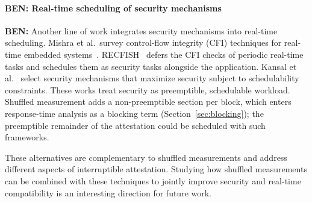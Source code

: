 \documentclass{ieeeaccess}
\DeclareRobustCommand{\ben}[1]{{\color{BENcolor}\textbf{BEN:} #1}}
\begin{document}
\paragraph{\ben{Real-time scheduling of security mechanisms}}
\ben{Another line of work integrates security mechanisms into real-time scheduling.
Mishra et al.\ survey control-flow integrity (CFI) techniques for real-time embedded systems~\cite{mishra2022survey}.
RECFISH~\cite{mishra2023procrastinating} defers the CFI checks of periodic real-time tasks and schedules them as security tasks alongside the application.
Kansal et al.~\cite{kansal2023integrated} select security mechanisms that maximize security subject to schedulability constraints.
These works treat security as preemptible, schedulable workload.
Shuffled measurement adds a non-preemptible section per block, which enters response-time analysis as a blocking term (Section~\ref{sec:blocking}); the preemptible remainder of the attestation could be scheduled with such frameworks.}


These alternatives are complementary to shuffled measurements and address different aspects of interruptible attestation.
Studying how shuffled measurements can be combined with these techniques to jointly improve security and real-time compatibility is an interesting direction for future work.
\end{document}

